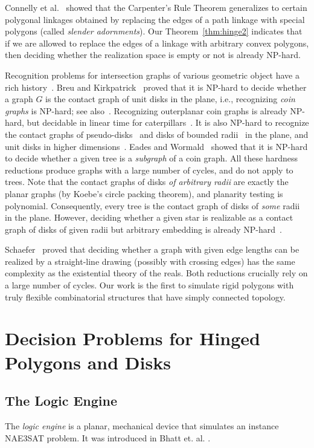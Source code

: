 \documentclass[10pt]{CSUNthesis}
\theoremstyle{plain}%
\theoremstyle{definition}
\theoremstyle{remark}
\begin{document}
Connelly et al.~\cite{CDD+10} showed that the Carpenter's Rule Theorem generalizes to certain polygonal linkages obtained by replacing the edges of a path linkage with special polygons (called \emph{slender adornments}). Our Theorem~\ref{thm:hinge2} indicates that if we are allowed to replace the edges of a linkage with arbitrary convex polygons, then deciding whether the realization space is empty or not is already NP-hard.

Recognition problems for intersection graphs of various geometric object have a rich history~\cite{HK01}.
Breu and Kirkpatrick~\cite{BK98} proved that it is NP-hard to decide whether a graph $G$ is the contact graph of unit disks in the plane, i.e., recognizing \emph{coin graphs} is NP-hard; see also~\cite{BET+99}. Recognizing outerplanar coin graphs is already NP-hard, but decidable in linear time for caterpillars~\cite{KNR15}. It is also NP-hard to recognize the contact graphs of pseudo-disks~\cite{HK01} and disks of bounded radii~\cite{BK95} in the plane, and unit disks in higher dimensions~\cite{Hli97,HK01}. Eades and Wormald~\cite{EW90} showed that it is NP-hard to decide whether a given tree is a \emph{subgraph} of a coin graph. All these hardness reductions produce graphs with a large number of cycles, and do not apply to trees. Note that the contact graphs of disks \emph{of arbitrary radii} are exactly the planar graphs (by Koebe's circle packing theorem), and planarity testing is polynomial. Consequently, every tree is the contact graph of disks of \emph{some} radii in the plane.
However, deciding whether a given star is realizable as a contact graph of disks of given radii but arbitrary embedding is already NP-hard~\cite{KNR15}.

Schaefer~\cite{Sch13} proved that deciding whether a graph with given edge lengths can be realized by a straight-line drawing (possibly with crossing edges) has the same complexity as the existential theory of the reals. Both reductions crucially rely on a large number of cycles. Our work is the first to simulate rigid polygons with truly flexible combinatorial structures that have simply connected topology.

\chapter{Decision Problems for Hinged Polygons and Disks}\label{chapter:logicEngine}

\section{The Logic Engine}
The \textit{logic engine} is a planar, mechanical device that simulates an instance NAE3SAT problem. It was introduced in Bhatt et. al. \cite{BC87}.
\end{document}
